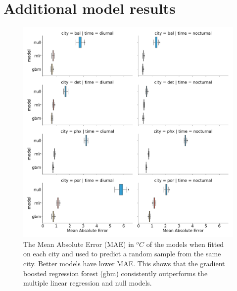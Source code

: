 \documentclass[]{elsarticle}
\begin{document}
\section{Additional model results}
\begin{figure}[h]
\begin{center}
\includegraphics[width=\textwidth]{fig/report/holdout_results_mae.pdf}
\caption{The Mean Absolute Error (MAE) in $^oC$ of the models when fitted on each city and used to predict a random sample from the same city. Better models have lower MAE. This shows that the gradient boosted regression forest (gbm) consistently outperforms the multiple linear regression and null models. }
\label{fig:cityholdout_errors}
\end{center}
\end{figure}
\end{document}
